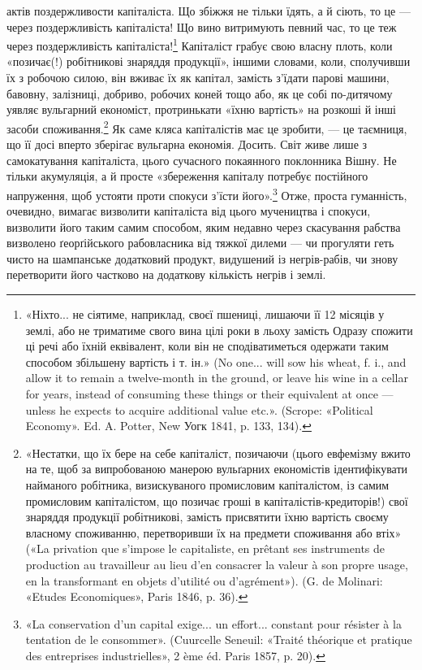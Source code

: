 актів поздержливости капіталіста. Що збіжжя не тільки їдять,
а й сіють, то це — через поздержливість капіталіста! Що вино
витримують певний час, то це теж через поздержливість капіталіста!\footnote{
«Ніхто... не сіятиме, наприклад, своєї пшениці, лишаючи її
12 місяців у землі, або не триматиме свого вина цілі роки в льоху замість
Одразу спожити ці речі або їхній еквівалент, коли він не сподіватиметься
одержати таким способом збільшену вартість і т. ін.» (No one... will sow
his wheat, f. i., and allow it to remain a twelve-month in the ground,
or leave his wine in a cellar for years, instead of consuming these things
or their equivalent at once — unless he expects to acquire additional value
etc.». (Scrope: «Political Economy». Ed. A. Potter, New Уогк 1841,
p. 133, 134).
} Капіталіст грабує свою власну плоть, коли «позичає(!)
робітникові знаряддя продукції», іншими словами, коли,
сполучивши їх з робочою силою, він вживає їх як капітал, замість
з’їдати парові машини, бавовну, залізниці, добриво, робочих
коней тощо або, як це собі по-дитячому уявляє вульгарний
економіст, протринькати «їхню вартість» на розкоші
й інші засоби споживання.\footnote{
«Нестатки, що їх бере на себе капіталіст, позичаючи (цього
евфемізму вжито на те, щоб за випробованою манерою вульґарних економістів
ідентифікувати найманого робітника, визискуваного промисловим
капіталістом, із самим промисловим капіталістом, що позичає гроші
в капіталістів-кредиторів!) свої знаряддя продукції робітникові, замість
присвятити їхню вартість своєму власному споживанню, перетворивши
їх на предмети споживання або втіх» («La privation que s’impose le
capitaliste, en prêtant ses instruments de production au travailleur au lieu
d’en consacrer la valeur à son propre usage, en la transformant en objets
d'utilité ou d’agrément»). (G. de Molinari: «Etudes Economiques», Paris
1846, p. 36).
} Як саме кляса капіталістів має
це зробити, — це таємниця, що її досі вперто зберігає вульгарна
економія. Досить. Світ живе лише з самокатування капіталіста,
цього сучасного покаянного поклонника Вішну. Не тільки
акумуляція, а й просте «збереження капіталу потребує постійного
напруження, щоб устояти проти спокуси з’їсти його».\footnote{
«La conservation d’un capital exige... un effort... constant pour
résister à la tentation de le consommer». (Cuurcelle Seneuil: «Traité théorique
et pratique des entreprises industrielles», 2 ème éd. Paris 1857, p. 20).
}
Отже, проста гуманність, очевидно, вимагає визволити капіталіста
від цього мучеництва і спокуси, визволити його таким самим
способом, яким недавно через скасування рабства визволено
ґеорґійського рабовласника від тяжкої дилеми — чи прогуляти
геть чисто на шампанське додатковий продукт, видушений із
негрів-рабів, чи знову перетворити його частково на додаткову
кількість негрів і землі.

